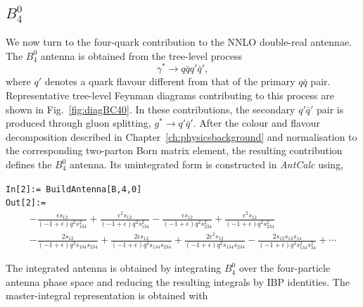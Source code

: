 \subsection{$B_4^0$}\label{subsec:B40}

We now turn to the four-quark contribution to the NNLO double-real antennae. The $B_4^0$
antenna is obtained from the tree-level process
\begin{equation*}
    \gamma^*\rightarrow q\bar q q'\bar q',
\end{equation*}
where $q'$ denotes a quark flavour different from that of the primary $q\bar q$ pair.
Representative tree-level Feynman diagrams contributing to this process are shown in Fig.~\ref{fig:diagBC40}.
In these contributions, the secondary $q'\bar q'$ pair is produced through gluon splitting,
$g^*\to q'\bar q'$. After the colour and flavour decomposition described in
Chapter~\ref{ch:physicsbackground} and normalisation to the corresponding two-parton Born
matrix element, the resulting contribution defines the $B_4^0$ antenna. Its unintegrated form is
constructed in \textit{AntCalc} using,

\begin{mdframed}[backgroundcolor=gray!10, linewidth=0pt]
\texttt{In[2]:= BuildAntenna[B,4,0]}\\
\hfill
\texttt{Out[2]:=}
    \begin{equation*}
        \begin{gathered}
            -\frac{\epsilon s_{12}}{(-1+\epsilon)q^2s_{134}^2}+\frac{\epsilon^2s_{12}}{(-1+\epsilon)q^2s_{134}^2}-\frac{\epsilon s_{12}}{(-1+\epsilon)q^2s_{234}^2}+\frac{\epsilon^2s_{12}}{(-1+\epsilon)q^2s_{234}^2}\\
            -\frac{2s_{12}}{(-1+\epsilon)q^2s_{134}s_{234}}+\frac{2\epsilon s_{12}}{(-1+\epsilon)q^2s_{134}s_{234}}+\frac{2\epsilon^2s_{12}}{(-1+\epsilon)q^2s_{134}s_{234}}-\frac{2s_{12}s_{13}s_{14}}{(-1+\epsilon)q^2s_{134}^2s_{34}^2}+\cdots
        \end{gathered}
    \end{equation*}
\end{mdframed}

The integrated antenna is obtained by integrating $B_4^0$ over the four-particle antenna phase
space and reducing the resulting integrals by IBP identities. The master-integral representation
is obtained with

